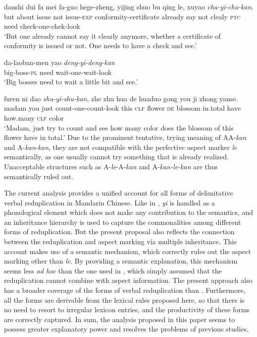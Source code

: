 \documentclass[11pt,a4paper,fleqn,draft]{article}
\let\textbf\emph
\begin{document}
\ea\label{ex:AyiAkan}
  \ea
  \gll danshi dui fa mei fa-guo hege-zheng, yijing shuo bu qing le, xuyao \textbf{cha-yi-cha-kan}.\\
  but about issue not issue-\textsc{exp} conformity-certificate already say not clealy \textsc{ptc} need check-one-chek-look\\ 
  \glt `But one already cannot say it clearly anymore, whether a certificate of conformity is issued or not. One needs to have a check and see.'
  
  \ex
  \gll da-laoban-men yao \textbf{deng-yi-deng-kan}\\
  big-boss-\textsc{pl} need wait-one-wait-look\\ 
  \glt `Big bosses need to wait a little bit and see.'
  
  \ex
  \gll furen ni dao \textbf{shu-yi-shu-kan}, zhe zhu hua de huaduo gong you ji zhong yanse.\\
  madam you just count-one-count-look this \textsc{clf} flower \textsc{de} blossom in.total have how.many \textsc{clf} color\\ 
  \glt `Madam, just try to count and see how many color does the blossom of this flower have in total.'
  \z
\z
Due to the prominent tentative, trying meaning of AA-\emph{kan} and A-\emph{kan}-\emph{kan}, they are not compatible with the perfective aspect marker \emph{le} semantically,
as one usually cannot try something that is already realized.
Unacceptable structures such as  A\hyp{}\emph{le}\hyp{}A\hyp{}\emph{kan} and A\hyp{}\emph{kan\hyp{}le\hyp{}kan} are thus semantically ruled out.

The current analysis provides a unified account for all forms of delimitative verbal reduplication in Mandarin Chinese.
Like in \citet{FanSongBond2015}, \emph{yi} is handled as a phonological element which does not make any contribution to the semantics,
 and an inheritance hierarchy is used to capture the commonalities among different forms of reduplication.
But the present proposal also reflects the connection between the reduplication and aspect marking via multiple inheritance.
This account makes use of a semantic mechanism, which correctly rules out the aspect marking other than \emph{le}.
By providing a semantic explanation, this mechanism seems less \emph{ad hoc} than the one used in \citet{FanSongBond2015}, which simply assumed that the reduplication cannot combine with aspect information.
The present approach also has a broader coverage of the forms of verbal reduplication than \citet{FanSongBond2015}.
Furthermore, all the forms are derivable from the lexical rules proposed here, so that there is no need to resort to irregular lexicon entries, and the productivity of these forms are correctly captured.
In sum, the analysis proposed in this paper seems to possess greater explanatory power and resolves the problems of previous studies.
\end{document}
